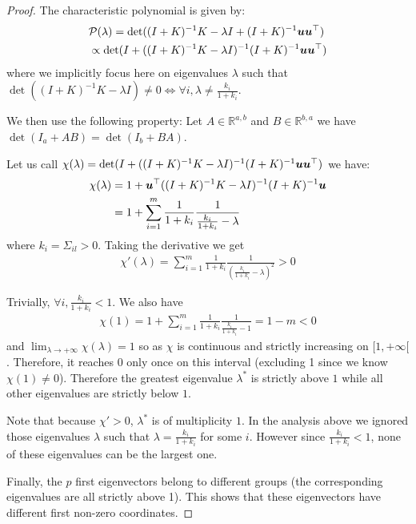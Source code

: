 \begin{proof}
The characteristic polynomial is given by:
\begin{align}
  &\mathcal{P}(\lambda) = \det( (I + K)^{-1} K - \lambda I + (I + K)^{-1} \boldsymbol{u} \boldsymbol{u}^{\top}) \label{carpol} \\
  &\propto \det( I + ((I + K)^{-1} K - \lambda I)^{-1}(I + K)^{-1} \boldsymbol{u} \boldsymbol{u}^{\top})
\end{align}
where we implicitly focus here on eigenvalues $\lambda$ such that $\det((I + K)^{-1} K - \lambda I) \neq 0 \iff \forall i, \lambda \neq \frac{k_i}{1 + k_i}$.

We then use the following property:
Let $A \in \mathbb{R}^{a, b}$ and $B \in \mathbb{R}^{b, a}$ we have
$\det(I_a + AB) = \det(I_b + BA)$.

Let us call $\chi(\lambda) = \det( I + ((I + K)^{-1} K - \lambda I)^{-1}(I + K)^{-1} \boldsymbol{u} \boldsymbol{u}^{\top})$ we have:
\begin{align}
\chi(\lambda)
  &= 1 + \boldsymbol{u}^{\top}((I + K)^{-1} K - \lambda I)^{-1}(I + K)^{-1} \boldsymbol{u} \\
  &= 1  + \sum_{i=1}^m \frac1{1 + k_i} \frac1{ \frac{k_i}{1 + k_i} - \lambda}
\end{align}
where $k_i = \Sigma_{il} > 0$.
Taking the derivative we get 
\begin{align}
\chi'(\lambda) = \sum_{i=1}^m \frac1{1 + k_i} \frac1{ (\frac{k_i}{1 + k_i} - \lambda)^2} > 0
\end{align}

Trivially, $\forall i, \frac{k_i}{1 + k_i} < 1$. We also have
\begin{align}
  \chi(1) = 1 + \sum_{i=1}^{m} \frac1{1 + k_i} \frac1{ \frac{k_i}{1 + k_i} - 1} = 1 - m < 0
\end{align}
 and $\lim_{\lambda \rightarrow + \infty} \chi(\lambda) = 1$ so as $\chi$
 is continuous and strictly increasing on $[1, +\infty[$. Therefore, it reaches $0$ only once on this interval (excluding 1 since we know $\chi(1) \neq 0$). Therefore the greatest eigenvalue $\lambda^*$ is strictly above $1$ while all other eigenvalues are strictly below $1$.
 
  Note that because $\chi' > 0$, $\lambda^*$ is of multiplicity $1$. In the analysis above we ignored those eigenvalues $\lambda$ such that $\lambda = \frac{k_i}{1 + k_i}$ for some $i$. However since $\frac{k_i}{1 + k_i} < 1$, none of these eigenvalues can be the largest one.
 
 Finally, the $p$ first eigenvectors belong to different groups (the
 corresponding eigenvalues are all strictly above 1). This shows that these eigenvectors have
 different first non-zero coordinates. 
 
\end{proof}

